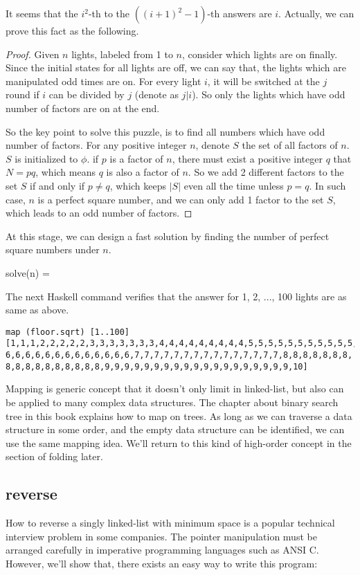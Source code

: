 \documentclass[UTF8]{article}
\begin{document}
It seems that the $i^2$-th to the $((i+1)^2-1)$-th answers are $i$. Actually, we can prove this fact as the following.

\begin{proof}
Given $n$ lights, labeled from 1 to $n$, consider which lights are on finally. Since the initial states for all lights
are off, we can say that, the lights which are manipulated odd times are on. For every light $i$, it will be switched
at the $j$ round if $i$ can be divided by $j$ (denote as $j | i$). So only the lights which have odd number of factors are on at the end.

So the key point to solve this puzzle, is to find all numbers which have odd number of factors. For any positive integer
$n$, denote $S$ the set of all factors of $n$. $S$ is initialized to $\phi$. if $p$ is a factor of $n$, there must
exist a positive integer $q$ that $N = p q$, which means $q$ is also a factor of $n$. So we add 2 different factors to
the set $S$ if and only if $p \neq q$, which keeps $|S|$ even all the time unless $p = q$. In such case, $n$ is a
perfect square number, and we can only add 1 factor to the set $S$, which leads to an odd number of factors.
\end{proof}


At this stage, we can design a fast solution by finding the number of perfect square numbers under $n$.

\be
solve(n) = \lfloor {} \rfloor
\ee

The next Haskell command verifies that the answer for 1, 2, ..., 100 lights are as same as above.

\begin{lstlisting}
map (floor.sqrt) [1..100]
[1,1,1,2,2,2,2,2,3,3,3,3,3,3,3,4,4,4,4,4,4,4,4,4,5,5,5,5,5,5,5,5,5,5,5,
6,6,6,6,6,6,6,6,6,6,6,6,6,7,7,7,7,7,7,7,7,7,7,7,7,7,7,7,8,8,8,8,8,8,8,
8,8,8,8,8,8,8,8,8,8,9,9,9,9,9,9,9,9,9,9,9,9,9,9,9,9,9,9,9,10]
\end{lstlisting}

Mapping is generic concept that it doesn't only limit in linked-list, but also can be applied to many
complex data structures. The chapter about binary search tree in this book explains how to map on trees.
As long as we can traverse a data structure in some order, and the empty data structure can be identified,
we can use the same mapping idea. We'll return to this kind of high-order concept in the section of folding
later.

\subsection{reverse}
How to reverse a singly linked-list with minimum space is a popular technical interview problem in some companies.
The pointer manipulation must be arranged carefully in imperative programming languages such as ANSI C.
However, we'll show that, there exists an easy way to write this program:
\end{document}
